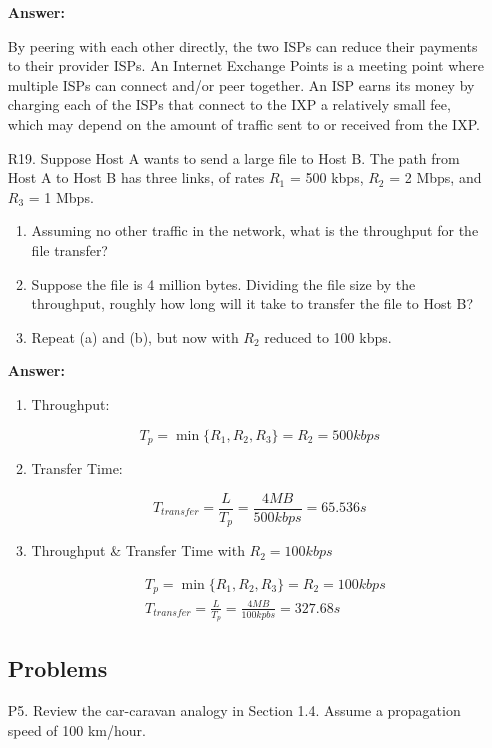 \begin{enumerate}
	\textbf{Answer:}
	
	By peering with each other directly, the two ISPs can reduce their payments to their provider ISPs. An Internet Exchange Points is a meeting point where multiple ISPs can connect and/or peer together. An ISP earns its money by charging each of the ISPs that connect to the IXP a relatively small fee, which may depend on the amount of traffic sent to or received from the IXP.
	
	\item[R19.]
	Suppose Host A wants to send a large file to Host B. The path from Host A to
	Host B has three links, of rates $R_{1}$ = 500 kbps, $R_{2}$ = 2 Mbps, and $R_{3}$ = 1 Mbps.
	
	\begin{enumerate}
    	\item Assuming no other traffic in the network, what is the throughput for the file transfer?
    	
    	\item Suppose the file is 4 million bytes. Dividing the file size by the throughput,	roughly how long will it take to transfer the file to Host B?
    	
    	\item Repeat (a) and (b), but now with $R_{2}$ reduced to 100 kbps.	    
	\end{enumerate}
	
	\textbf{Answer:}

	\begin{enumerate}
		\item Throughput:

		$$
		    T_p =  \min\{R_1, R_2, R_3\} = R_2 = 500 kbps 
		$$

		\item Transfer Time:
		
		$$
    		T_{transfer} = \frac{L}{T_p} = \frac{4 MB}{500 kbps} = 65.536 s
		$$

		\item Throughput \& Transfer Time with $R_2 = 100 kbps$
		
		\begin{align*}
    		& T_p  = \min\{R_1, R_2, R_3\} = R_2 = 100 kbps \\
    		& T_{transfer} = \frac{L}{T_p} = \frac{4 MB}{100 kpbs} = 327.68 s
		\end{align*}
	\end{enumerate}
		
	\subsection{Problems}
	\item[P5.] Review the car-caravan analogy in Section 1.4. Assume a propagation speed of 100 km/hour.
	

\end{enumerate}
